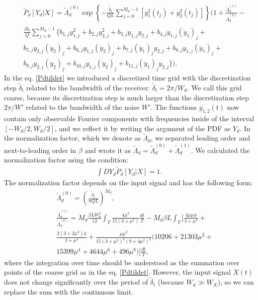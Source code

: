 \documentclass{article}
\begin{document}
\begin{eqnarray}\label{Pdtildet}
    &&\tilde{P}_{d}[Y_{d}|X] = \tilde{\Lambda}_{d}^{(0)} \exp\left\{-\frac{\tilde{\delta}_{t}}{QL}\sum_{j=0}^{M_{d}-1} \left[y_{1}^{2}(t_{j}) + y_{2}^{2}(t_{j})\right]\right\}\Bigg(1 + \frac{\tilde{\Lambda}_{d}^{(1)}}{\tilde{\Lambda}_{d}^{(0)}} -\nonumber\\
    && \frac{\beta\tilde{\delta}_{t}}{Q} \sum_{j=0}^{M_{d}-1} \{b_{1,j}y_{1,j}^{2} + b_{2,j}y_{2,j}^{2} + b_{3,j}y_{1,j}y_{2,j} + b_{4,j}y_{1,j}(\dot{y}_{1})_{j}  + \nonumber\\
    && b_{5,j}y_{2,j}(\dot{y}_{2})_{j} +b_{6,j}y_{1,j}(\dot{y}_{2})_{j} + b_{7,j}(\dot{y}_{1})_{j}y_{2,j} + b_{8,j}y_{1,j}(\ddot{y}_{1})_{j}+ \nonumber\\
    && b_{9,j}y_{2,j}(\ddot{y}_{2})_{j} + b_{10,j}y_{1,j}(\ddot{y}_{2})_{j} + b_{11,j}(\ddot{y}_{1})_{j}y_{2,j}\}\Bigg).
\end{eqnarray}
In the eq. \eqref{Pdtildet} we introduced a discretized time grid with the discretization step $\tilde{\delta}_{t}$ related to the bandwidth of the receiver: $\tilde{\delta}_{t}=2 \pi/W_{d}$. We call this grid coarse, because its discretization step is much larger than the discretization step $2\pi/W'$ related to the bandwidth of the noise $W'$. The functions $y_{1,2}(t)$ now contain only observable Fourier components with frequencies inside of the interval $[-W_{d}/2,W_{d}/2]$, and we reflect it by writing the argument of the PDF as $Y_{d}$. In the normalization factor, which we denote as $\tilde{\Lambda}_{d}$, we separated leading order and next-to-leading order in $\beta$ and wrote it as $\tilde{\Lambda}_{d} = \tilde{\Lambda}^{(0)}_{d}+\tilde{\Lambda}^{(1)}_{d}$. We calculated the normalization factor using the condition: 
\begin{eqnarray}
    \int DY_{d} \tilde{P}_{d}[Y_{d}|X] = 1.
\end{eqnarray}
The normalization factor depends on the input signal and has the following form: 
\begin{eqnarray}\label{tildelambda}
    && \tilde{\Lambda}_{d}^{(0)} = \left(\frac{\tilde{\delta}_{t}}{\pi Q L}\right)^{M_{d}}, \nonumber \\
    &&\frac{\tilde{\Lambda}_{d}^{(1)}}{\tilde{\Lambda}_{d}^{(0)}} = M_{d}\frac{\beta L W_{d}^{2}}{12} \int_{T} \frac{4 \mu^{3}}{15(3+\mu^{2})} \frac{dt}{T} - M_{d} \beta L \int_{T} \Bigg[\frac{4\mu\dot{\mu}\dot{\phi}}{3+\mu^{2}} +\nonumber\\
    && \frac{2(3+2\mu^{2})\ddot{\phi}}{3+\mu^{2}} + \frac{\mu\dot{\mu}^{2}}{15(3+\mu^{2})^{3}(9+4\mu^{2})^{2}}(10206 + 21303\mu^{2} +\nonumber \\
    &&15399\mu^{4}+4644\mu^{6} +496\mu^{8})\Bigg]\frac{dt}{T},
\end{eqnarray}
where the integration over time should be understood as the summation over points of the coarse grid as in the eq. \eqref{Pdtildet}. However, the input signal $X(t)$ does not change significantly over the period of $\tilde{\delta}_{t}$ (because $W_{d} \gg W_{X}$), so we can replace the sum with the continuous limit. 
\end{document}
